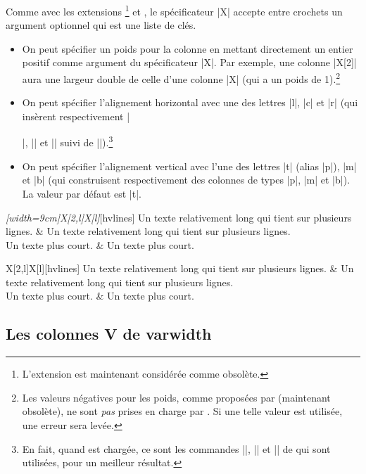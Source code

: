 \documentclass[dvipsnames]{article}%
\begin{document}
Comme avec les extensions \footnote{L'extension  est
  maintenant considérée comme obsolète.} et , le spécificateur |X|
accepte entre crochets un argument optionnel qui est une liste de clés.
\begin{itemize}
\item On peut spécifier un poids pour la colonne en mettant directement un
entier positif comme argument du spécificateur |X|. Par exemple, une colonne
|X[2]| aura une largeur double de celle d'une colonne |X| (qui a un poids de
1).\footnote{Les valeurs négatives pour les poids, comme proposées par
   (maintenant obsolète), ne sont \emph{pas} prises en charge par
  . Si une telle valeur est utilisée, une erreur sera levée.}
\item On peut spécifier l'alignement horizontal avec une des lettres |l|, |c| et
|r| (qui insèrent respectivement |\raggedright|, |\centering| et |\raggedleft|
suivi de |\arraybackslash|).\footnote{En fait, quand  est chargée,
ce sont les commandes |\RaggedRight|, |\Centering| et |\RaggedLeft| de
 qui sont utilisées, pour un meilleur résultat.}
\item On peut spécifier l'alignement vertical avec l'une des lettres |t| (alias
|p|), |m| et |b| (qui construisent respectivement des colonnes de types |p|, |m|
et |b|). La valeur par défaut est |t|.
\end{itemize}

\begin{Code}
\begin{NiceTabular}\emph{[width=9cm]{X[2,l]X[l]}}[hvlines]
Un texte relativement long qui tient sur plusieurs lignes. &
Un texte relativement long qui tient sur plusieurs lignes. \\
Un texte plus court. & Un texte plus court.
\end{NiceTabular}
\end{Code}


\begin{center}
\begin{NiceTabular}[width=9cm]{X[2,l]X[l]}[hvlines]
Un texte relativement long qui tient sur plusieurs lignes. &
Un texte relativement long qui tient sur plusieurs lignes. \\
Un texte plus court. & Un texte plus court.
\end{NiceTabular}
\end{center}

\subsection{Les colonnes V de varwidth}
\end{document}

